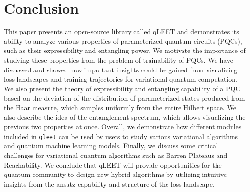 \section{\label{sec:conclusion}Conclusion}

This paper presents an open-source library called qLEET and demonstrates its ability to analyze various properties of parameterized quantum circuits (PQCs), such as their expressibility and entangling power. We motivate the importance of studying these properties from the problem of trainability of PQCs. We have discussed and showed how important insights could be gained from visualizing loss landscapes and training trajectories for variational quantum computation. We also present the theory of expressibility and entangling capability of a PQC based on the deviation of the distribution of parameterized states produced from the Haar measure, which samples uniformly from the entire Hilbert space. We also describe the idea of the entanglement spectrum, which allows visualizing the previous two properties at once. Overall, we demonstrate how different modules included in \texttt{qleet} can be used by users to study various variational algorithms and quantum machine learning models. Finally, we discuss some critical challenges for variational quantum algorithms such as Barren Plateaus and Reachability. We conclude that qLEET will provide opportunities for the quantum community to design new hybrid algorithms by utilizing intuitive insights from the ansatz capability and structure of the loss landscape.
